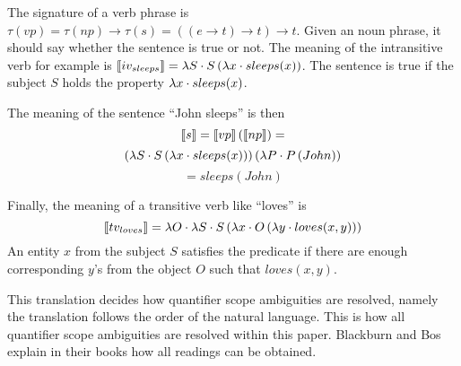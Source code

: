 The signature of a verb phrase is $\tau(vp) = \tau(np) \rightarrow \tau(s) = ((e \rightarrow t) \rightarrow t) \rightarrow t$. Given an noun phrase, it should say whether the sentence is true or not. The meaning of the intransitive verb for example is $\llbracket iv_{sleeps} \rrbracket = \lambda S \cdot S \left( \lambda x \cdot sleeps(x) \right)$. The sentence is true if the subject $S$ holds the property $\lambda x \cdot sleeps(x)$.

The meaning of the sentence ``John sleeps'' is then $$\llbracket s \rrbracket = \llbracket vp \rrbracket \left( \llbracket np \rrbracket \right) =$$$$ \left( \lambda S \cdot S \left( \lambda x \cdot sleeps(x) \right) \right) \left( \lambda P \cdot P \left( John \right) \right)$$$$= sleeps(John)$$

Finally, the meaning of a transitive verb like ``loves'' is $$\llbracket tv_{loves} \rrbracket = \lambda O \cdot \lambda S \cdot S \left( \lambda x \cdot O \left( \lambda y \cdot loves(x, y) \right) \right)$$ An entity $x$ from the subject $S$ satisfies the predicate if there are enough corresponding $y$'s from the object $O$ such that $loves(x, y)$.

This translation decides how quantifier scope ambiguities are resolved, namely the translation follows the order of the natural language. This is how all quantifier scope ambiguities are resolved within this paper. Blackburn and Bos explain in their books how all readings can be obtained.



